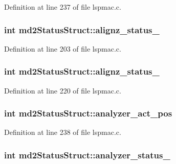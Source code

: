 Definition at line 237 of file lspmac.c.\hypertarget{structmd2StatusStruct_aadbfac5709de57e449a37e2937d6ade7}{
\subsubsection[{alignz\_\-status\_\-1}]{\setlength{\rightskip}{0pt plus 5cm}int {\bf md2StatusStruct::alignz\_\-status\_}}}
\label{structmd2StatusStruct_aadbfac5709de57e449a37e2937d6ade7}


Definition at line 203 of file lspmac.c.\hypertarget{structmd2StatusStruct_ac378da16eeaab2bc47f3f8f88f7411ed}{
\subsubsection[{alignz\_\-status\_\-2}]{\setlength{\rightskip}{0pt plus 5cm}int {\bf md2StatusStruct::alignz\_\-status\_}}}
\label{structmd2StatusStruct_ac378da16eeaab2bc47f3f8f88f7411ed}


Definition at line 220 of file lspmac.c.\hypertarget{structmd2StatusStruct_a49d1151b0e819646587be0ca9c9d612a}{
\subsubsection[{analyzer\_\-act\_\-pos}]{\setlength{\rightskip}{0pt plus 5cm}int {\bf md2StatusStruct::analyzer\_\-act\_\-pos}}}
\label{structmd2StatusStruct_a49d1151b0e819646587be0ca9c9d612a}


Definition at line 238 of file lspmac.c.\hypertarget{structmd2StatusStruct_ab876b484f55bcce576fcd89dcc3f7267}{
\subsubsection[{analyzer\_\-status\_\-1}]{\setlength{\rightskip}{0pt plus 5cm}int {\bf md2StatusStruct::analyzer\_\-status\_}}}
\label{structmd2StatusStruct_ab876b484f55bcce576fcd89dcc3f7267}


